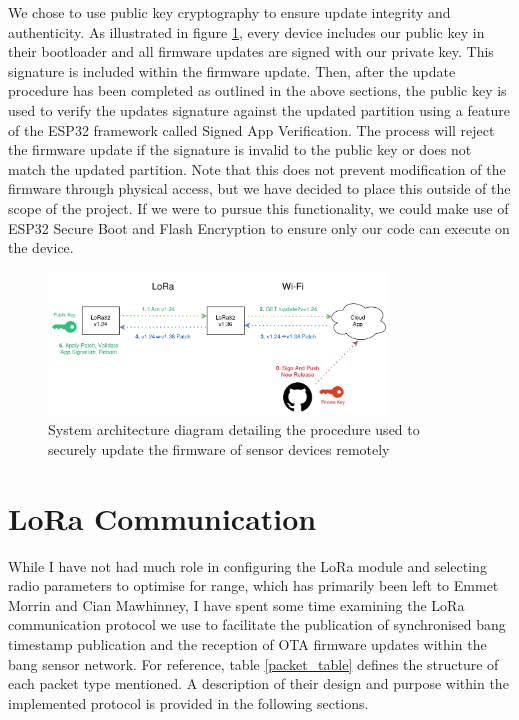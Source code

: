 \documentclass[conference]{IEEEtran}
\begin{document}
We chose to use public key cryptography to ensure update integrity and authenticity. As illustrated in figure \ref{updates_figure}, every device includes our public key in their bootloader and all firmware updates are signed with our private key. This signature is included within the firmware update. Then, after the update procedure has been completed as outlined in the above sections, the public key is used to verify the updates signature against the updated partition using a feature of the ESP32 framework called Signed App Verification. The process will reject the firmware update if the signature is invalid to the public key or does not match the updated partition. Note that this does not prevent modification of the firmware through physical access, but we have decided to place this outside of the scope of the project. If we were to pursue this functionality, we could make use of ESP32 Secure Boot and Flash Encryption to ensure only our code can execute on the device.

\begin{figure}[ht]
\centerline{\includegraphics[width=90mm]{images/updates.png}}
\caption{System architecture diagram detailing the procedure used to securely update the firmware of sensor devices remotely}
\label{updates_figure}
\end{figure}




\section{LoRa Communication} \label{lora}

While I have not had much role in configuring the LoRa module and selecting radio parameters to optimise for range, which has primarily been left to Emmet Morrin and Cian Mawhinney, I have spent some time examining the LoRa communication protocol we use to facilitate the publication of synchronised bang timestamp publication and the reception of OTA firmware updates within the bang sensor network. For reference, table \ref{packet_table} defines the structure of each packet type mentioned. A description of their design and purpose within the implemented protocol is provided in the following sections.
\end{document}
